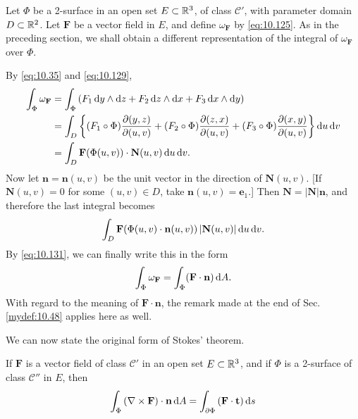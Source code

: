 \begin{mydef}
    \label{mydef:10.49}
    Let $\Phi$ be a 2-surface in an open set $E \subset {\protect\mathbb R}^3$,
    of class $\mathscr{C}'$, with parameter domain $D \subset {\protect\mathbb R}^2$. 
    Let $\mathbf{F}$ be a vector field in $E$, and define $\omega_{\mathbf{F}}$ by \eqref{eq:10.125}. 
    As in the preceding section, we shall obtain a different representation of the integral of $\omega_{\mathbf{F}}$ over $\Phi$.

    By \eqref{eq:10.35} and \eqref{eq:10.129},
    \begin{align*}
        \int_{\Phi} \omega_{\mathbf{F}} 
        &= \int_{\Phi} \left( 
            F_1 \d y \wedge \d z + 
            F_2 \d z \wedge \d x + 
            F_3 \d x \wedge \d y  
            \right) \\
        &= \int_{D} \left\{ 
            (F_1 \circ \Phi) \frac{\partial (y,z)}{\partial (u,v)} + 
            (F_2 \circ \Phi) \frac{\partial (z,x)}{\partial (u,v)} + 
            (F_3 \circ \Phi) \frac{\partial (x,y)}{\partial (u,v)} 
         \right\} \d u \d v \\
        &= \int_{D} \mathbf{F}(\Phi(u,v))\cdot \mathbf{N}(u,v) \d u \d v .
    \end{align*}
    Now let $\mathbf{n} = \mathbf{n}(u, v)$ be the unit vector in the direction of $\mathbf{N}(u, v)$. 
    [If $\mathbf{N}(u, v) = 0$ for some $(u, v) \in D$, 
    take $\mathbf{n}(u, v) = \mathbf{e}_1$.] 
    Then $\mathbf{N = |N |n}$, and therefore the last integral becomes
    \begin{equation*}
        \int_{D} \mathbf{F}(\Phi(u,v)\cdot \mathbf{n}(u,v))
        \left| \mathbf{N}(u,v) \right| \d u \d v .
    \end{equation*}
    By \eqref{eq:10.131}, we can finally write this in the form
    \begin{equation}
        \label{eq:10.144}
        \int_{\Phi} \omega_{\mathbf{F}} = 
        \int_{\Phi} (\mathbf{F \cdot n}) \d A .
    \end{equation}
    With regard to the meaning of $\mathbf{F \cdot n}$, 
    the remark made at the end of Sec. \ref{mydef:10.48} applies here as well.
\end{mydef}

We can now state the original form of Stokes' theorem.

\begin{thm}
    \label{thm:10.50}
    If $\mathbf{F}$ is a vector field of class $\mathscr{C}'$ in an open set $E \subset {\protect\mathbb R}^3$, 
    and if $\Phi$ is a 2-surface of class $\mathscr{C}''$ in $E$, then
    \begin{equation}
        \label{eq:10.145}
        \int_{\Phi} \left( \nabla \times \mathbf{F} \right) \cdot \mathbf{n} \d A = 
        \int_{\partial \Phi} \left( \mathbf{F \cdot t} \right)  \d s
    \end{equation}
\end{thm}

